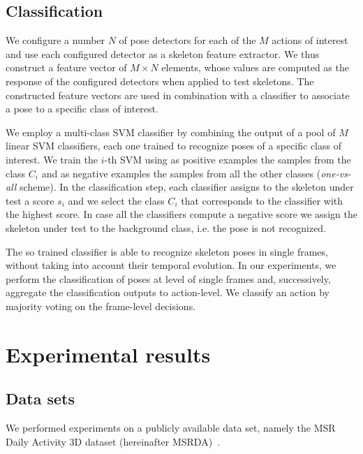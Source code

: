 \documentclass[runningheads,a4paper]{llncs}
\begin{document}
\subsection{Classification}
We configure a number $N$ of pose detectors for each of the $M$ actions of interest and use each configured detector as a skeleton feature extractor. We thus construct a feature vector of $M\times N$ elements, whose values are computed as the response of the configured detectors when applied to test skeletons.
The constructed feature vectors are used in combination with a classifier to associate a pose to a specific class of interest.

We employ a multi-class SVM classifier by combining the output of a pool of $M$ linear SVM classifiers, each one trained to recognize poses of a specific class of interest.
We train the $i$-th SVM using as positive examples the samples from the class $C_i$ and as negative examples  the samples from all the other classes (\emph{one-vs-all} scheme).  
In the classification step, each classifier assigns to the skeleton under test a score $s_i$ and we select the class $C_i$ that corresponds to the classifier with the highest score. In case all the classifiers compute a negative score we assign the skeleton under test to the background class, i.e. the pose is not recognized.

The so trained classifier is able to recognize skeleton poses in single frames, without taking into account their temporal evolution. In our experiments, we perform the classification of poses at level of single frames and, successively, aggregate the classification outputs to action-level. We classify an action by majority voting on the frame-level decisions.

\section{Experimental results}
\label{sec:exp}

\subsection{Data sets}
We performed experiments on a publicly available data set, namely the MSR Daily Activity 3D dataset (hereinafter MSRDA)~\cite{Wu12_dataset}.
\end{document}
